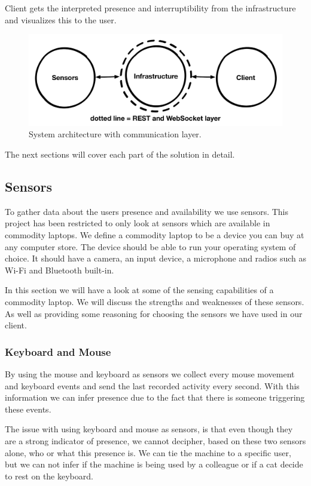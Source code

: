 \documentclass{sigchi}
\begin{document}
Client gets the interpreted presence and interruptibility from the infrastructure and visualizes this to the user.

\begin{figure}[H]
  \centering
  \includegraphics[width=\columnwidth]{figures/system_architecture.pdf}
  \caption{System architecture with communication layer.}
  \label{fig:architecture}
\end{figure}

The next sections will cover each part of the solution in detail.

\subsection{Sensors}
To gather data about the users presence and availability we use sensors.
This project has been restricted to only look at sensors which are available in commodity laptops.
We define a commodity laptop to be a device you can buy at any computer store.
The device should be able to run your operating system of choice.
It should have a camera, an input device, a microphone and radios such as Wi-Fi and Bluetooth built-in.

In this section we will have a look at some of the sensing capabilities of a commodity laptop.
We will discuss the strengths and weaknesses of these sensors.
As well as providing some reasoning for choosing the sensors we have used in our client.

\subsubsection{Keyboard and Mouse}
By using the mouse and keyboard as sensors we collect every mouse movement and keyboard events and send the last recorded activity every second.
With this information we can infer presence due to the fact that there is someone triggering these events.

The issue with using keyboard and mouse as sensors, is that even though they are a strong indicator of presence, we cannot decipher, based on these two sensors alone, who or what this presence is.
We can tie the machine to a specific user, but we can not infer if the machine is being used by a colleague or if a cat decide to rest on the keyboard.
\end{document}
